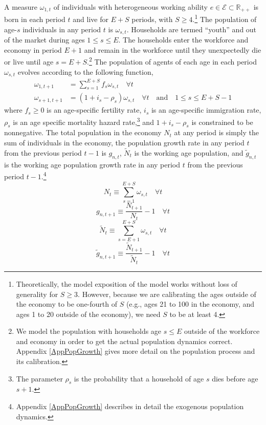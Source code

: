 \documentclass[letterpaper,12pt]{article}
\theoremstyle{definition}
\begin{document}
\begin{spacing}{1.5}
    A measure $\omega_{1,t}$ of individuals with heterogeneous working ability $e \in\mathcal{E}\subset\mathbb{R}_{++}$ is born in each period $t$ and live for $E+S$ periods, with $S\geq 4$.\footnote{Theoretically, the model exposition of the model works without loss of generality for $S\geq 3$. However, because we are calibrating the ages outside of the economy to be one-fourth of $S$ (e.g., ages 21 to 100 in the economy, and ages 1 to 20 outside of the economy), we need $S$ to be at least 4.} The population of age-$s$ individuals in any period $t$ is $\omega_{s,t}$. Households are termed ``youth'' and out of the market during ages $1\leq s\leq E$. The households enter the workforce and economy in period $E+1$ and remain in the workforce until they unexpectedly die or live until age $s=E+S$.\footnote{We model the population with households age $s\leq E$ outside of the workforce and economy in order to get the actual population dynamics correct. Appendix \ref{AppPopGrowth} gives more detail on the population process and its calibration.} The population of agents of each age in each period $\omega_{s,t}$ evolves according to the following function,
    \begin{equation}\label{EqPopLawofmotion}
      \begin{split}
        \omega_{1,t+1} &= \sum_{s=1}^{E+S} f_s\omega_{s,t}\quad\forall t \\
        \omega_{s+1,t+1} &= (1 + i_s - \rho_s)\omega_{s,t}\quad\forall t\quad\text{and}\quad 1\leq s \leq E+S-1
      \end{split}
    \end{equation}
    where $f_s\geq 0$ is an age-specific fertility rate, $i_s$ is an age-specific immigration rate, $\rho_s$ is an age specific mortality hazard rate,\footnote{The parameter $\rho_s$ is the probability that a household of age $s$ dies before age $s+1$.} and $1+i_s-\rho_s$ is constrained to be nonnegative. The total population in the economy $N_t$ at any period is simply the sum of individuals in the economy, the population growth rate in any period $t$ from the previous period $t-1$ is $g_{n,t}$, $\tilde{N}_t$ is the working age population, and $\tilde{g}_{n,t}$ is the working age population growth rate in any period $t$ from the previous period $t-1$.\footnote{Appendix \ref{AppPopGrowth} describes in detail the exogenous population dynamics.}
    \begin{equation}\label{EqPopDef}
      N_t\equiv\sum_{s=1}^{E+S} \omega_{s,t} \quad\forall t
    \end{equation}
    \begin{equation}\label{EqPopGrowth}
      g_{n,t+1} \equiv \frac{N_{t+1}}{N_t} - 1 \quad\forall t
    \end{equation}
    \begin{equation}\label{EqPopWkDef}
      \tilde{N}_t\equiv\sum_{s=E+1}^{E+S} \omega_{s,t} \quad\forall t
    \end{equation}
    \begin{equation}\label{EqPopWkGrowth}
      \tilde{g}_{n,t+1} \equiv \frac{\tilde{N}_{t+1}}{\tilde{N}_t} - 1 \quad\forall t
    \end{equation}


\end{spacing}
\end{document}
